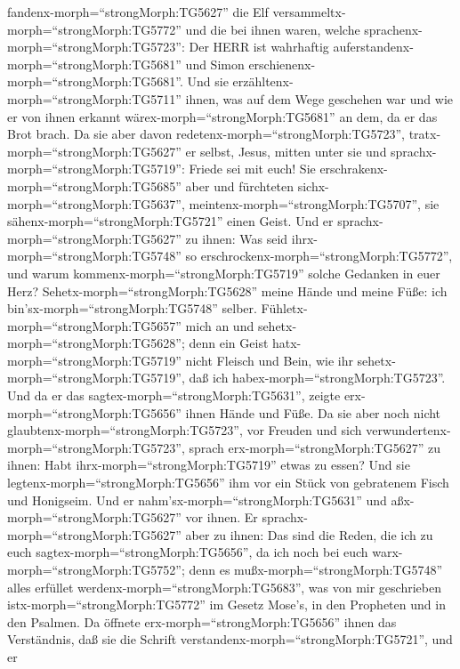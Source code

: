 fandenx-morph=``strongMorph:TG5627'' die Elf
versammeltx-morph=``strongMorph:TG5772'' und die bei ihnen waren,
 welche sprachenx-morph=``strongMorph:TG5723'': Der HERR
ist wahrhaftig auferstandenx-morph=``strongMorph:TG5681'' und Simon
erschienenx-morph=``strongMorph:TG5681''.  Und sie
erzähltenx-morph=``strongMorph:TG5711'' ihnen, was auf dem Wege
geschehen war und wie er von ihnen erkannt
wärex-morph=``strongMorph:TG5681'' an dem, da er das Brot brach.
 Da sie aber davon redetenx-morph=``strongMorph:TG5723'',
tratx-morph=``strongMorph:TG5627'' er selbst, Jesus, mitten unter sie
und sprachx-morph=``strongMorph:TG5719'': Friede sei mit euch!
 Sie erschrakenx-morph=``strongMorph:TG5685'' aber und
fürchteten sichx-morph=``strongMorph:TG5637'',
meintenx-morph=``strongMorph:TG5707'', sie
sähenx-morph=``strongMorph:TG5721'' einen Geist.  Und er
sprachx-morph=``strongMorph:TG5627'' zu ihnen: Was seid
ihrx-morph=``strongMorph:TG5748'' so
erschrockenx-morph=``strongMorph:TG5772'', und warum
kommenx-morph=``strongMorph:TG5719'' solche Gedanken in euer Herz?
 Sehetx-morph=``strongMorph:TG5628'' meine Hände und meine
Füße: ich bin'sx-morph=``strongMorph:TG5748'' selber.
Fühletx-morph=``strongMorph:TG5657'' mich an und
sehetx-morph=``strongMorph:TG5628''; denn ein Geist
hatx-morph=``strongMorph:TG5719'' nicht Fleisch und Bein, wie ihr
sehetx-morph=``strongMorph:TG5719'', daß ich
habex-morph=``strongMorph:TG5723''.  Und da er das
sagtex-morph=``strongMorph:TG5631'', zeigte
erx-morph=``strongMorph:TG5656'' ihnen Hände und Füße.  Da
sie aber noch nicht glaubtenx-morph=``strongMorph:TG5723'', vor Freuden
und sich verwundertenx-morph=``strongMorph:TG5723'', sprach
erx-morph=``strongMorph:TG5627'' zu ihnen: Habt
ihrx-morph=``strongMorph:TG5719'' etwas zu essen?  Und sie
legtenx-morph=``strongMorph:TG5656'' ihm vor ein Stück von gebratenem
Fisch und Honigseim.  Und er
nahm'sx-morph=``strongMorph:TG5631'' und
aßx-morph=``strongMorph:TG5627'' vor ihnen.  Er
sprachx-morph=``strongMorph:TG5627'' aber zu ihnen: Das sind die Reden,
die ich zu euch sagtex-morph=``strongMorph:TG5656'', da ich noch bei
euch warx-morph=``strongMorph:TG5752''; denn es
mußx-morph=``strongMorph:TG5748'' alles erfüllet
werdenx-morph=``strongMorph:TG5683'', was von mir geschrieben
istx-morph=``strongMorph:TG5772'' im Gesetz Mose's, in den Propheten und
in den Psalmen.  Da öffnete
erx-morph=``strongMorph:TG5656'' ihnen das Verständnis, daß sie die
Schrift verstandenx-morph=``strongMorph:TG5721'',  und er
